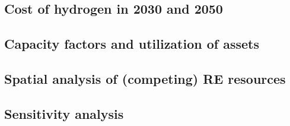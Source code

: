 \subsection{Cost of hydrogen in 2030 and 2050}
\subsection{Capacity factors and utilization of assets}
\subsection{Spatial analysis of (competing) RE resources}
\subsection{Sensitivity analysis}